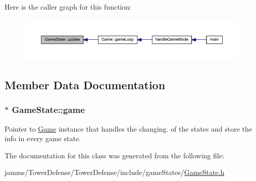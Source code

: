 Here is the caller graph for this function\+:
\nopagebreak
\begin{figure}[H]
\begin{center}
\leavevmode
\includegraphics[width=350pt]{class_game_state_ad331d02d3989271b8cbc88fcb1448959_icgraph}
\end{center}
\end{figure}




\subsection{Member Data Documentation}
\hypertarget{class_game_state_a355a79415b9ef63c2aec1448a99f6e71}{
\subsubsection[{game}]{$\ast$ Game\+State\+::game}}\label{class_game_state_a355a79415b9ef63c2aec1448a99f6e71}


Pointer to \hyperlink{class_game}{Game} instance that handles the changing. of the states and store the info in every game state. 



The documentation for this class was generated from the following file\+:\begin{DoxyCompactItemize}
\item 
jamms/\+Tower\+Defense/\+Tower\+Defense/include/game\+States/\hyperlink{_game_state_8h}{Game\+State.\+h}\end{DoxyCompactItemize}
